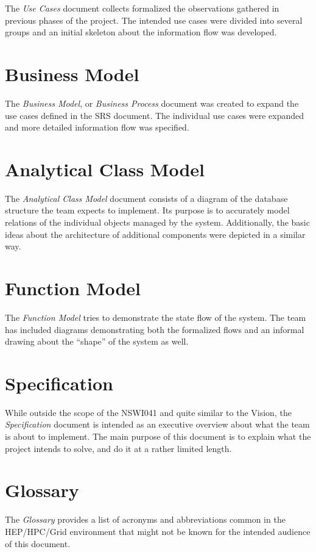 \documentclass[12pt]{article}
\begin{document}
The {\em Use Cases} document collects formalized the observations gathered in previous phases of the project.  The intended use
cases were divided into several groups and an initial skeleton about the information flow was developed.

\section{Business Model}

The {\em Business Model}, or {\em Business Process} document was created to expand the use cases defined in the SRS document.  The
individual use cases were expanded and more detailed information flow was specified.

\section{Analytical Class Model}

The {\em Analytical Class Model} document consists of a diagram of the database structure the team expects to implement.  Its
purpose is to accurately model relations of the individual objects managed by the system.  Additionally, the basic ideas about the
architecture of additional components were depicted in a similar way.

\section{Function Model}

The {\em Function Model} tries to demonstrate the state flow of the system.  The team has included diagrams demonstrating both the
formalized flows and an informal drawing about the ``shape'' of the system as well.

\section{Specification}

While outside the scope of the NSWI041 and quite similar to the Vision, the {\em Specification} document is intended as an
executive overview about what the team is about to implement.  The main purpose of this document is to explain what the project
intends to solve, and do it at a rather limited length.

\section{Glossary}

The {\em Glossary} provides a list of acronyms and abbreviations common in the HEP/HPC/Grid environment that might not be known
for the intended audience of this document.
\end{document}
